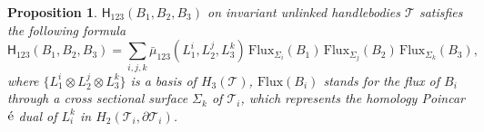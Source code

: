 \documentclass[12pt]{article}
\numberwithin{equation}{section}
\newtheorem{proposition}[theorem]{Proposition}
\begin{document}
\begin{proposition}
 $\mathsf{H}_{123}(B_1,B_2,B_3)$ on invariant unlinked handlebodies $\mathcal{T}$ satisfies the following formula
 \begin{equation}\label{eq:helicity-fluxes}
 \mathsf{H}_{123}(B_1,B_2,B_3)=\sum_{i, j, k} \bar{\mu}_{123}(L^i_1, L^j_2, L^k_3)\,\text{Flux}_{\Sigma_i}(B_1)\,\text{Flux}_{\Sigma_j}(B_2)\,\text{Flux}_{\Sigma_k}(B_3),
 \end{equation}
where $\{L^i_1\otimes L^j_2\otimes L^k_3\}$ is a basis of $H_3(\mathcal{T})$, $\text{Flux}(B_i)$ stands for the flux of $B_i$ through a cross sectional surface $\Sigma_k$ of $\mathcal{T}_i$, which represents the homology Poincar$\acute{\rm e}$ dual of $L^k_i$ in $H_2(\mathcal{T}_i,\partial\mathcal{T}_i)$.

\end{proposition}
\end{document}
